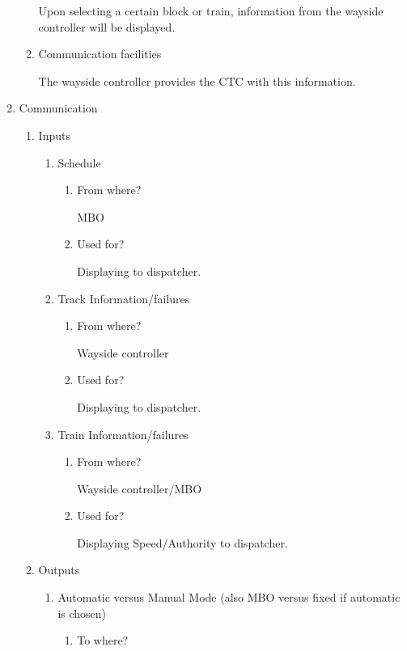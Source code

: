 \documentclass[11pt]{article}
\begin{document}
\begin{enumerate}
\begin{enumerate}
Upon selecting a certain block or train, information from the wayside controller will be displayed.
\item Communication facilities
\label{sec-3-1-1-4-2}

The wayside controller provides the CTC with this information.
\end{enumerate}
\item Communication
\label{sec-3-1-1-5}
\begin{enumerate}
\item Inputs
\label{sec-3-1-1-5-1}
\begin{enumerate}
\item Schedule
\label{sec-3-1-1-5-1-1}
\begin{enumerate}
\item From where?
\label{sec-3-1-1-5-1-1-1}

MBO
\item Used for?
\label{sec-3-1-1-5-1-1-2}

Displaying to dispatcher.
\end{enumerate}
\item Track Information/failures
\label{sec-3-1-1-5-1-2}
\begin{enumerate}
\item From where?
\label{sec-3-1-1-5-1-2-1}

Wayside controller
\item Used for?
\label{sec-3-1-1-5-1-2-2}

Displaying to dispatcher.
\end{enumerate}
\item Train Information/failures
\label{sec-3-1-1-5-1-3}
\begin{enumerate}
\item From where?
\label{sec-3-1-1-5-1-3-1}

Wayside controller/MBO
\item Used for?
\label{sec-3-1-1-5-1-3-2}

Displaying Speed/Authority to dispatcher.
\end{enumerate}
\end{enumerate}
\item Outputs
\label{sec-3-1-1-5-2}
\begin{enumerate}
\item Automatic versus Manual Mode (also MBO versus fixed if automatic is chosen)
\label{sec-3-1-1-5-2-1}
\begin{enumerate}
\item To where?
\label{sec-3-1-1-5-2-1-1}


\end{enumerate}
\end{enumerate}
\end{enumerate}
\end{enumerate}
\end{document}
